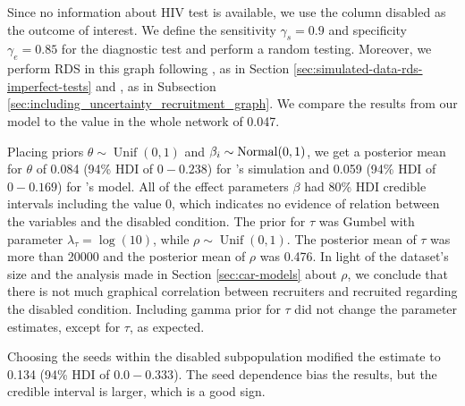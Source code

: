 Since no information about HIV test is available, we use the
column disabled as the outcome of interest. We define the sensitivity
$\gamma_s = 0.9$ and specificity $\gamma_e = 0.85$ for the diagnostic test and
perform a random testing. Moreover, we perform
RDS in this graph following \textcite{baraff2016estimating}, as in Section
\ref{sec:simulated-data-rds-imperfect-tests} and \textcite{crawford2016}, as
in Subsection \ref{sec:including_uncertainty_recruitment_graph}. We compare
the results from our model to the value in the whole network of 0.047. 

Placing priors $\theta \sim \operatorname{Unif}(0,1)$ and $\beta_i \sim
\operatorname{Normal}(0,1)$, we get a posterior mean for $\theta$ of 0.084 (94\% HDI of $0 -
0.238$) for \textcite{baraff2016estimating}'s simulation and 
0.059 (94\% HDI of $0 - 0.169$) for \textcite{crawford2016}'s model.
All of the effect parameters $\beta$ had 80\% HDI credible intervals
including the value $0$, which indicates no evidence of relation between the variables and
the disabled condition. The prior for $\tau$ was Gumbel with parameter
$\lambda_{\tau} = \log(10)$, while $\rho \sim \operatorname{Unif}(0,1)$. The
posterior mean of $\tau$ was more than 20000 and the posterior mean of $\rho$
was 0.476. In light of the dataset's size and the analysis made in Section
\ref{sec:car-models} about $\rho$, we conclude that there is not much graphical correlation
between recruiters and recruited regarding the disabled condition. Including
gamma prior for $\tau$ did not change the parameter estimates, except for
$\tau$, as expected.

Choosing the seeds within the disabled subpopulation modified the estimate to
0.134 (94\% HDI of $0.0 - 0.333$). The seed dependence bias the results, but
the credible interval is larger, which is a good sign. 